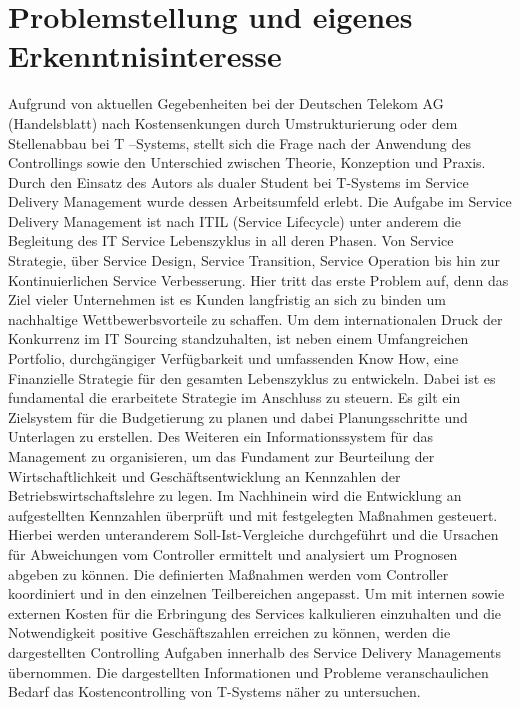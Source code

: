 

\chapter{Problemstellung und eigenes Erkenntnisinteresse}
\label{ch:Einleitung}

Aufgrund von aktuellen Gegebenheiten bei der Deutschen Telekom AG (Handelsblatt) nach Kostensenkungen durch Umstrukturierung oder dem Stellenabbau bei T –Systems, stellt sich die Frage nach der Anwendung des Controllings sowie den Unterschied zwischen Theorie, Konzeption und Praxis.
Durch den Einsatz des Autors als dualer Student bei T-Systems im Service Delivery Management wurde dessen Arbeitsumfeld erlebt. Die Aufgabe im Service Delivery Management ist nach ITIL (Service Lifecycle) unter anderem die Begleitung des IT Service Lebenszyklus in all deren Phasen. Von Service Strategie, über Service Design, Service Transition, Service Operation bis hin zur Kontinuierlichen Service Verbesserung. 
Hier tritt das erste Problem auf, denn das Ziel vieler Unternehmen ist es Kunden langfristig an sich zu binden um nachhaltige Wettbewerbsvorteile zu schaffen. 
Um dem internationalen Druck der Konkurrenz im IT Sourcing standzuhalten, ist neben einem Umfangreichen Portfolio, durchgängiger Verfügbarkeit und umfassenden Know How, eine Finanzielle Strategie für den gesamten Lebenszyklus zu entwickeln. Dabei ist es fundamental die erarbeitete Strategie im Anschluss zu steuern. Es gilt ein Zielsystem für die Budgetierung zu planen und dabei Planungsschritte und Unterlagen zu erstellen. Des Weiteren ein Informationssystem für das Management zu organisieren, um das Fundament zur Beurteilung der Wirtschaftlichkeit und Geschäftsentwicklung an Kennzahlen der Betriebswirtschaftslehre zu legen. Im Nachhinein wird die Entwicklung an aufgestellten Kennzahlen überprüft und mit festgelegten Maßnahmen gesteuert. Hierbei werden unteranderem Soll-Ist-Vergleiche durchgeführt und die Ursachen für Abweichungen vom Controller ermittelt und analysiert um Prognosen abgeben zu können. Die definierten Maßnahmen werden vom Controller koordiniert und in den einzelnen Teilbereichen angepasst.
Um mit internen sowie externen Kosten für die Erbringung des Services kalkulieren einzuhalten und die Notwendigkeit positive Geschäftszahlen erreichen zu können, werden die dargestellten Controlling Aufgaben innerhalb des Service Delivery Managements übernommen.
Die dargestellten Informationen und Probleme veranschaulichen Bedarf das Kostencontrolling von T-Systems näher zu untersuchen.




